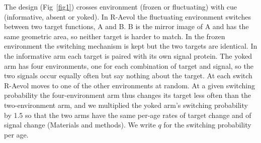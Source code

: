 \documentclass[10pt,letterpaper]{article}
\begin{document}
The design (Fig~\ref{fig1}) crosses environment (frozen or fluctuating) with cue
(informative, absent or yoked). In R-Aevol the fluctuating environment switches
between two target functions, A and B. B is the mirror image of A and has the
same geometric area, so neither target is harder to match. In the frozen
environment the switching mechanism is kept but the two targets are identical.
In the informative arm each target is paired with its own signal protein. The
yoked arm has four environments, one for each combination of target and signal,
so the two signals occur equally often but say nothing about the target. At each
switch R-Aevol moves to one of the other environments at random. At a given
switching probability the four-environment arm thus changes its target less
often than the two-environment arm, and we multiplied the yoked arm's switching
probability by 1.5 so that the two arms have the same per-age rates of target change and of signal change (Materials and methods). We write $q$ for the switching
probability per age.
\end{document}
